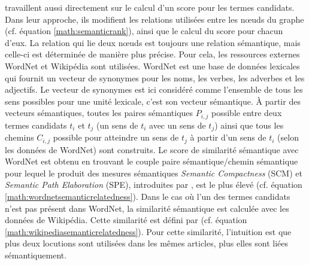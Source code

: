         \citet{tsatsaronis2010semanticrank} travaillent aussi directement sur le
        calcul d'un score pour les termes candidats. Dans leur approche, ils modifient les
        relations utilisées entre les n\oe{}uds du graphe (cf. équation
        \ref{math:semanticrank}), ainsi que le calcul du score pour chacun d'eux.
        La relation qui lie deux n\oe{}uds est toujours une relation sémantique,
        mais celle-ci est déterminée de manière plus précise. Pour cela, les
        ressources externes WordNet \citep{fellbaum2010wordnet} et Wikipédia sont
        utilisées. WordNet est une base de données lexicales qui fournit un
        vecteur de synonymes pour les noms, les verbes, les adverbes et les
        adjectifs. Le vecteur de synonymes est ici considéré comme l'ensemble de
        tous les sens possibles pour une unité lexicale, c'est son vecteur
        sémantique. À partir des vecteurs sémantiques, toutes les paires
        sémantiques $P_{i, j}$ possible entre deux termes candidats $t_i$ et $t_j$ (un sens
        de $t_i$ avec un sens de $t_j$) ainsi que tous les chemins $C_{i, j}$
        possible pour atteindre un sens de $t_j$ à partir d'un sens de $t_i$
        (selon les données de WordNet) sont construits. Le score de similarité
        sémantique avec WordNet est obtenu en trouvant le couple paire
        sémantique/chemin sémantique pour lequel le produit des mesures
        sémantiques \textit{Semantic Compactness} (SCM) et \textit{Semantic Path
        Elaboration} (SPE), introduites par
        \citet{tsatsaronis2010textrelatedness}, est le plus élevé (cf. équation
        \ref{math:wordnetsemanticrelatedness}). Dans le cas où l'un des termes candidats
        n'est pas présent dans WordNet, la similarité sémantique est calculée avec
        les données de Wikipédia. Cette similarité est défini par
        \citet{milne2008wikipediasemanticrelatedness} (cf. équation
        \ref{math:wikipediasemanticrelatedness}). Pour cette similarité,
        l'intuition est que plus deux locutions sont utilisées dans les mêmes
        articles, plus elles sont liées sémantiquement.
